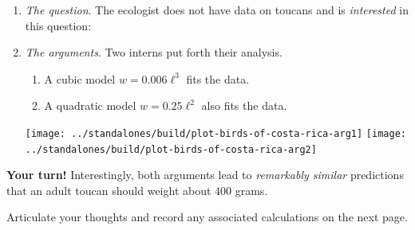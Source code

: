 \documentclass[../main.tex]{subfiles}
\begin{document}
\begin{example}
\begin{enumerate}[wide, label=(\arabic*)]
    \item \emph{The question}. The ecologist does not have data on toucans and is \emph{interested} in this question:
      \begin{center}
      \end{center}

    \item \emph{The arguments}. Two interns put forth their analysis. 
      \begin{enumerate}[wide, label=Intern \Alph*:]
        \item A cubic model \(w = 0.006 \ell^{3}\) fits the data.
        \item A quadratic model \(w = 0.25 \ell^{2}\) also fits the data.
      \end{enumerate}

      \texttt{[image: ../standalones/build/plot-birds-of-costa-rica-arg1]}
      \texttt{[image: ../standalones/build/plot-birds-of-costa-rica-arg2]}
  \end{enumerate}

  \medskip
  \begin{mdframed}[roundcorner=10pt]
    \textbf{Your turn!} Interestingly, both arguments lead to \emph{remarkably similar} predictions that an adult toucan should weight about \(400\) grams.
    \begin{center}
    \end{center}

  \end{mdframed}

  Articulate your thoughts and record any associated calculations on the next page.

\end{example}
\end{document}
